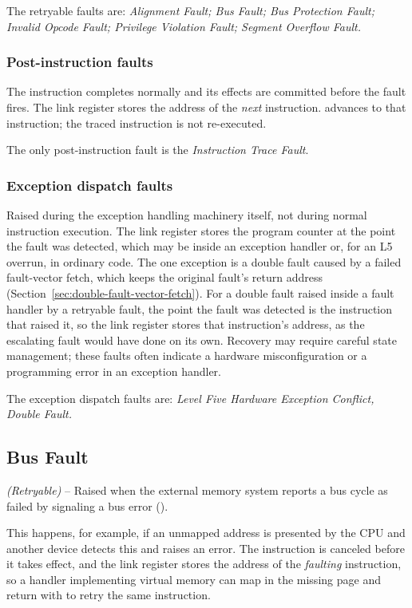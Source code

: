 The retryable faults are: \textit{Alignment Fault; Bus Fault; Bus Protection Fault; Invalid Opcode Fault; Privilege
	Violation Fault; Segment Overflow Fault.}

\subsubsection{Post-instruction faults}
The instruction completes normally and its effects are committed before the fault fires. The link register stores the
address of the \textit{next} instruction.  advances to that instruction; the traced instruction is not
re-executed.

The only post-instruction fault is the \textit{Instruction Trace Fault}.

\subsubsection{Exception dispatch faults}
Raised during the exception handling machinery itself, not during normal instruction execution. The link register
stores the program counter at the point the fault was detected, which may be inside an exception handler or, for an L5
overrun, in ordinary code. The one exception is a double fault caused by a failed fault-vector fetch, which keeps the
original fault's return address (Section~\ref{sec:double-fault-vector-fetch}). For a double fault raised inside a fault
handler by a retryable fault, the point the fault was detected is the instruction that raised it, so the link register
stores that instruction's address, as the escalating fault would have done on its own. Recovery may require careful
state management; these faults often indicate a hardware misconfiguration or a programming error in an exception
handler.

The exception dispatch faults are: \textit{Level Five Hardware Exception Conflict, Double Fault.}

\subsection{Bus Fault}

\textit{(Retryable)} -- Raised when the external memory system reports a bus cycle as failed by signaling a bus error
().

This happens, for example, if an unmapped address is presented by the CPU and another device detects this and raises an
error. The instruction is canceled before it takes effect, and the link register stores the address of the
\textit{faulting} instruction, so a handler implementing virtual memory can map in the missing page and return with
 to retry the same instruction.

